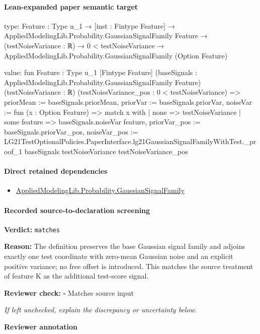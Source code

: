 \documentclass[10pt]{article}
\newcommand{\reviewerbox}{%
  \par\noindent\fbox{\parbox{0.96\linewidth}{\rule{0pt}{0.38in}}}\par
}
\newcommand{\reviewmatch}[1]{%
  \par\noindent\textbf{Reviewer check:} $\square$\; #1\par
  \noindent\emph{If left unchecked, explain the discrepancy or uncertainty below.}\par
}
\begin{document}
\paragraph{Lean-expanded paper semantic target}
\begin{ReviewVerbatim}
type:
{Feature : Type u_1} →
  [inst : Fintype Feature] →
    AppliedModelingLib.Probability.GaussianSignalFamily Feature →
      (testNoiseVariance : ℝ) →
        0 < testNoiseVariance → AppliedModelingLib.Probability.GaussianSignalFamily (Option Feature)

value:
fun {Feature : Type u_1} [Fintype Feature] (baseSignals : AppliedModelingLib.Probability.GaussianSignalFamily Feature)
    (testNoiseVariance : ℝ) (testNoiseVariance_pos : 0 < testNoiseVariance) =>
  { priorMean := baseSignals.priorMean, priorVar := baseSignals.priorVar,
    noiseVar := fun (x : Option Feature) =>
      match x with
      | none => testNoiseVariance
      | some feature => baseSignals.noiseVar feature,
    priorVar_pos := baseSignals.priorVar_pos,
    noiseVar_pos :=
      LG21TestOptionalPolicies.PaperInterface.lg21GaussianSignalFamilyWithTest._proof_1 baseSignals testNoiseVariance
        testNoiseVariance_pos }
\end{ReviewVerbatim}

\paragraph{Direct retained dependencies}
\begin{itemize}\raggedright
\item \hyperlink{library-prerequisite-c7f802398a145c63}{Applied\allowbreak{}Modeling\allowbreak{}Lib.\allowbreak{}Probability.\allowbreak{}Gaussian\allowbreak{}Signal\allowbreak{}Family}
\end{itemize}
\paragraph{Recorded source-to-declaration screening}
\textbf{Verdict:} \texttt{matches}
\\
{\raggedright
\textbf{Reason:} The definition preserves the base Gaussian signal family and adjoins exactly one test coordinate with zero-\allowbreak{}mean Gaussian noise and an explicit positive variance;\allowbreak{} no free offset is introduced.\allowbreak{} This matches the source treatment of feature K as the additional test-\allowbreak{}score signal.\allowbreak{}
\par}
\reviewmatch{Matches source input}
\noindent\textbf{Reviewer annotation}\par
\reviewerbox
\clearpage
\hypertarget{paper-prerequisite-6dd30b8b3874210f}{}
\end{document}
